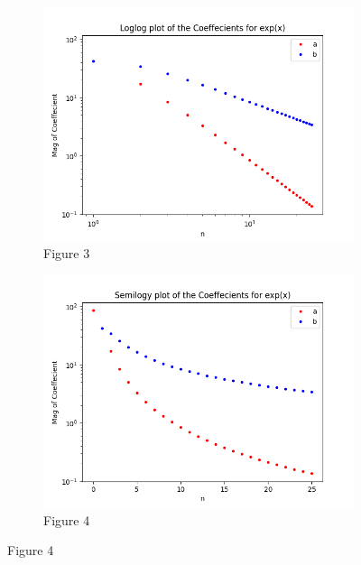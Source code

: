 \documentclass[12pt, a4paper]{report}
\begin{document}
\begin{figure}[h!]

\begin{subfigure}{0.55\textwidth}
    \centering
    \includegraphics[scale=0.9,width=\linewidth]{fig3.png} 
    \caption{Figure 3}
    \label{fig:my_label}
\end{subfigure}
\begin{subfigure}{0.55\textwidth}
    \centering
    \includegraphics[scale=0.9,width=\linewidth]{fig4.png} 
    \caption{Figure 4}
    \label{fig:image2}
\end{subfigure}


\end{figure}
\end{document}
